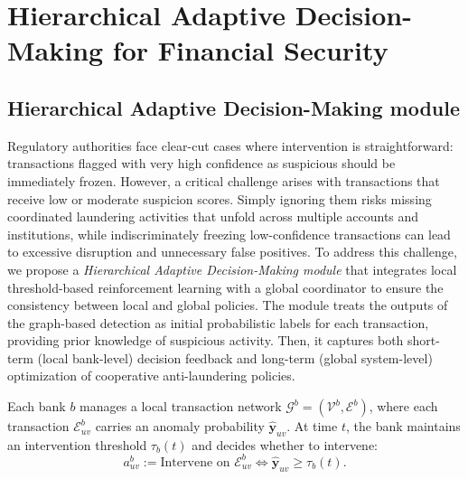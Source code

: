 \section{Hierarchical Adaptive Decision-Making for Financial Security}
\subsection{Hierarchical Adaptive Decision-Making module}
Regulatory authorities face clear-cut cases where intervention is straightforward: transactions flagged with very high confidence as suspicious should be immediately frozen. However, a critical challenge arises with transactions that receive low or moderate suspicion scores. Simply ignoring them risks missing coordinated laundering activities that unfold across multiple accounts and institutions, while indiscriminately freezing low-confidence transactions can lead to excessive disruption and unnecessary false positives. To address this challenge, we propose a \emph{Hierarchical Adaptive Decision-Making module} that integrates local threshold-based reinforcement learning with a global coordinator to ensure the consistency between local and global policies. The module treats the outputs of the graph-based detection as initial probabilistic labels for each transaction, providing prior knowledge of suspicious activity. Then, it captures both short-term (local bank-level) decision feedback and long-term (global system-level) optimization of cooperative anti-laundering policies.

Each bank $b$ manages a local transaction network $\mathcal{G}^b=(\mathcal{V}^b,\mathcal{E}^b)$, where each transaction $\mathcal{E}_{uv}^b$ carries an anomaly probability $\hat{\mathbf{y}}_{uv}$.  
At time $t$, the bank maintains an intervention threshold $\tau_b(t)$ and decides whether to intervene:
\begin{equation}
    a_{uv}^b:= \text{Intervene on } \mathcal{E}_{uv}^b \iff \hat{\mathbf{y}}_{uv} \geq \tau_b(t).
\end{equation}

